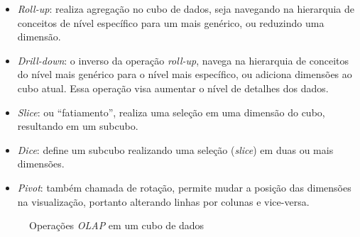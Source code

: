 \begin{itemize}
	\item \textit{Roll-up}: realiza agregação no cubo de dados, seja navegando na hierarquia de conceitos de nível específico para um mais genérico, ou reduzindo uma dimensão.
	\item \textit{Drill-down}: o inverso da operação \textit{roll-up}, navega na hierarquia de conceitos do nível mais genérico para o nível mais específico, ou adiciona dimensões ao cubo atual.
Essa operação visa aumentar o nível de detalhes dos dados.
	\item \textit{Slice}: ou ``fatiamento'', realiza uma seleção em uma dimensão do cubo, resultando em um subcubo.
	\item \textit{Dice}: define um subcubo realizando uma seleção (\textit{slice}) em duas ou mais dimensões.
	\item \textit{Pivot}: também chamada de rotação, permite mudar a posição das dimensões na visualização, portanto alterando linhas por colunas e vice-versa.
\end{itemize}

\begin{figure}[!htb]
  \caption{Operações \textit{OLAP} em um cubo de dados}\label{fig:olap}
	\vspace{4mm}
	\begin{center}
	\end{center}
	\vspace{2mm}
	\legenda{}
\end{figure}

